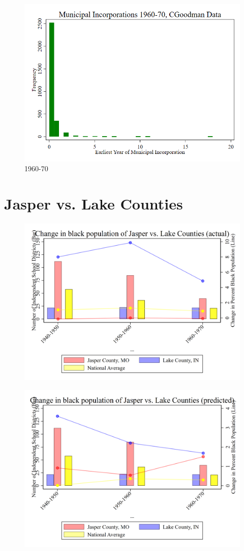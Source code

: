 \documentclass{article}
\begin{document}
\clearpage
\begin{figure}
	\centering
	\includegraphics[width=.8\textwidth]{figures/distributions/cgoodman_1960.png}
	\caption{1960-70}
\end{figure}
\clearpage

\section{Jasper vs. Lake Counties}
\clearpage
\begin{figure}
	\centering
	\includegraphics[width=.8\textwidth]{figures/descriptive/comparison.png}
\end{figure}
\clearpage
\begin{figure}
	\centering
	\includegraphics[width=.8\textwidth]{figures/descriptive/comparison_hat.png}
\end{figure}
\clearpage
\end{document}

